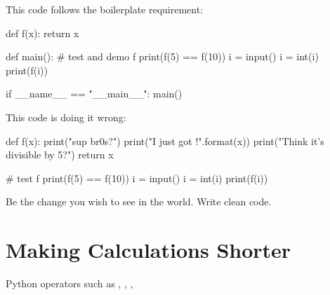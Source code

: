 \documentclass[11pt]{cselabheader}
\begin{document}
{\begin{multicols}{2}
This code follows the boilerplate requirement:
\begin{python3code}
def f(x):
    return x %

def main():
    # test and demo f
    print(f(5) == f(10))
    i = input()
    i = int(i)
    print(f(i))

if __name__ == "__main__":
    main()
\end{python3code}

\columnbreak
This code is doing it wrong:
\begin{python3code}
def f(x):
    print("sup br0s?")
    print("I just got {}!".format(x))
    print("Think it's divisible by 5?")
    return x %

# test f
print(f(5) == f(10))
i = input()
i = int(i)
print(f(i))
\end{python3code}
\end{multicols}

Be the change you wish to see in the world. Write clean code.

\section{Making Calculations Shorter}
\label{sec:calc}

Python operators such as \pythoninline{+}, \pythoninline{-},
\pythoninline{*}, \pythoninline{%
a variant of these that you can use to assign to a variable.

\begin{pyconcode}
>>> x = 5
>>> x += 3 # same as x = x + 3
>>> x
8
>>> x *= 10 # same as x = x * 10
>>> x
80

\end{pyconcode}

The available assignment operators are:
\begin{multicols}{3}
\begin{description}
  \item[\protect\pythonindex{+=}] addition
  \item[\protect\pythonindex{-=}] subtraction
  \item[\protect\pythonindex{*=}] multiplication
  \item[\protect\pythonindex{/=}] division
  \item[\protect\pythonindex{//=}] integer division
  \item[\protect\pythonindex{**=}] exponentiation
\end{description}
\end{multicols}


}}
\end{document}
